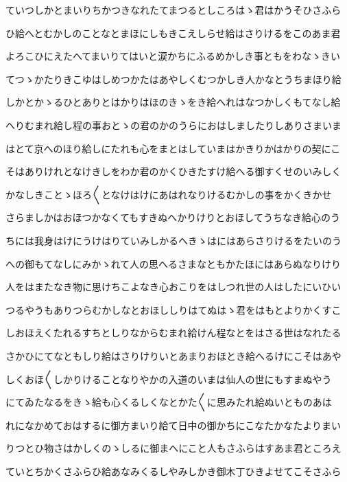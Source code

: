 \documentclass[a4paper,11pt,landscape]{ltjtarticle}
\begin{document}
\par\medskip
ていつしかとまいりちかつきなれたてまつるとしころはゝ君はかうそひさふら
\par\medskip
ひ給へとむかしのことなとまほにしもきこえしらせ給はさりけるをこのあま君
\par\medskip
よろこひにえたへてまいりてはいと涙かちにふるめかしき事ともをわなゝきい
\par\medskip
てつゝかたりきこゆはしめつかたはあやしくむつかしき人かなとうちまほり給
\par\medskip
しかとかゝるひとありとはかりはほのきゝをき給へれはなつかしくもてなし給
\par\medskip
へりむまれ給し程の事おとゝの君のかのうらにおはしましたりしありさまいま
\par\medskip
はとて京へのほり給しにたれも心をまとはしていまはかきりかはかりの契にこ
\par\medskip
そはありけれとなけきしをわか君のかくひきたすけ給へる御すくせのいみしく
\par\medskip
かなしきことゝほろ〱となけはけにあはれなりけるむかしの事をかくきかせ
\par\medskip
さらましかはおほつかなくてもすきぬへかりけりとおほしてうちなき給心のう
\par\medskip
ちには我身はけにうけはりていみしかるへきゝはにはあらさりけるをたいのう
\par\medskip
への御もてなしにみかゝれて人の思へるさまなともかたほにはあらぬなりけり
\par\medskip
人をはまたなき物に思けちこよなき心おこりをはしつれ世の人はしたにいひい
\par\medskip
つるやうもありつらむかしなとおほししりはてぬはゝ君をはもとよりかくすこ
\par\medskip
しおほえくたれるすちとしりなからむまれ給けん程なとをはさる世はなれたる
\par\medskip
さかひにてなともしり給はさりけりいとあまりおほとき給へるけにこそはあや
\par\medskip
しくおほ〱しかりけることなりやかの入道のいまは仙人の世にもすまぬやう
\par\medskip
にてゐたなるをきゝ給も心くるしくなとかた〱に思みたれ給ぬいとものあは
\par\medskip
れになかめておはするに御方まいり給て日中の御かちにこなたかなたよりまい
\par\medskip
りつとひ物さはかしくのゝしるに御まへにこと人もさふらはすあま君ところえ
\par\medskip
ていとちかくさふらひ給あなみくるしやみしかき御木丁ひきよせてこそさふら
\par\medskip
\end{document}
